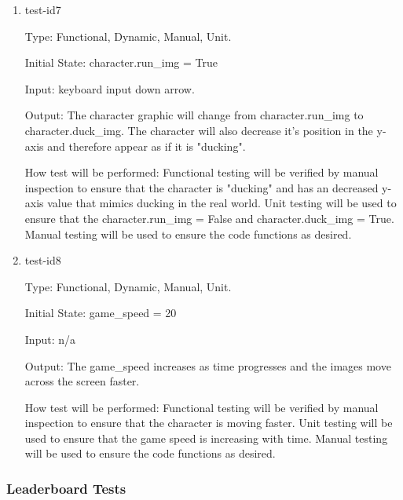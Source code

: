\documentclass[12pt, titlepage]{article}
\begin{document}
\begin{enumerate}
	\item{test-id7\\}
	
	Type: Functional, Dynamic, Manual, Unit.
	
	Initial State: character.run\_img = True
	
	Input: keyboard input down arrow. 
	
	Output: The character graphic will change from character.run\_img to character.duck\_img. The character will also decrease it's position in the y-axis and therefore appear as if it is "ducking". 
	
	How test will be performed: Functional testing will be verified by manual inspection to ensure that the character is "ducking" and has an decreased y-axis value that mimics ducking in the real world. Unit testing will be used to ensure that the character.run\_img = False and character.duck\_img = True. Manual testing will be used to ensure the code functions as desired. 
	
	\item{test-id8\\}
	
	Type: Functional, Dynamic, Manual, Unit.
	
	Initial State: game\_speed = 20
	
	Input: n/a
	
	Output: The game\_speed increases as time progresses and the images move across the screen faster. 
	
	How test will be performed: Functional testing will be verified by manual inspection to ensure that the character is moving faster. Unit testing will be used to ensure that the game speed is increasing with time. Manual testing will be used to ensure the code functions as desired. 

\end{enumerate}


\subsubsection{Leaderboard Tests}
\end{document}
